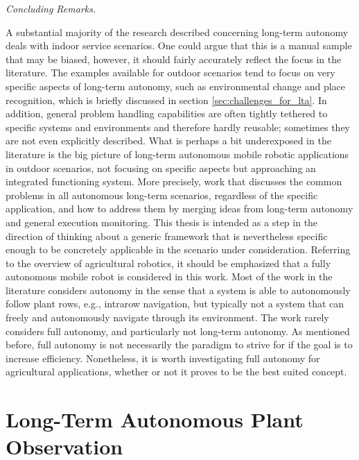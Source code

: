 \documentclass[english, master, utf8]{base/thesis_KBS}
\begin{document}
\noindent
\textit{Concluding Remarks.}\newline

\noindent
A substantial majority of the research described concerning long-term autonomy deals with indoor service scenarios. One could argue that this is a manual sample that may be biased,
however, it should fairly accurately reflect the focus in the literature. The examples available for outdoor scenarios tend to focus on very specific aspects of long-term autonomy,
such as environmental change and place recognition, which is briefly discussed in section \ref{sec:challenges_for_lta}. In addition, general problem handling capabilities are often
tightly tethered to specific systems and environments and therefore hardly reusable; sometimes they are not even explicitly described. What is perhaps a bit underexposed in the
literature is the big picture of long-term autonomous mobile robotic applications in outdoor scenarios, not focusing on specific aspects but approaching an integrated functioning
system. More precisely, work that discusses the common problems in all autonomous long-term scenarios, regardless of the specific application, and how to address them by merging
ideas from long-term autonomy and general execution monitoring. This thesis is intended as a step in the direction of thinking about a generic framework that is nevertheless specific
enough to be concretely applicable in the scenario under consideration. Referring to the overview of agricultural robotics, it should be emphasized that a fully autonomous mobile
robot is considered in this work. Most of the work in the literature considers autonomy in the sense that a system is able to autonomously follow plant rows, e.g., intrarow
navigation, but typically not a system that can freely and autonomously navigate through its environment. The work rarely considers full autonomy, and particularly not long-term
autonomy. As mentioned before, full autonomy is not necessarily the paradigm to strive for if the goal is to increase efficiency. Nonetheless, it is worth investigating full autonomy
for agricultural applications, whether or not it proves to be the best suited concept.

\section{Long-Term Autonomous Plant Observation}
\label{sec:lta_plant_observation}
\end{document}
